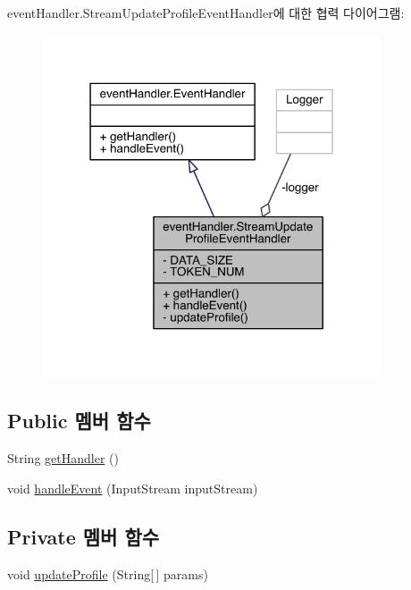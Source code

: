 event\+Handler.\+Stream\+Update\+Profile\+Event\+Handler에 대한 협력 다이어그램\+:
\nopagebreak
\begin{figure}[H]
\begin{center}
\leavevmode
\includegraphics[width=283pt]{classevent_handler_1_1_stream_update_profile_event_handler__coll__graph}
\end{center}
\end{figure}
\subsection*{Public 멤버 함수}
\begin{DoxyCompactItemize}
\item 
String \hyperlink{classevent_handler_1_1_stream_update_profile_event_handler_a24bf455a312c225975d472516b4bb6f9}{get\+Handler} ()
\item 
void \hyperlink{classevent_handler_1_1_stream_update_profile_event_handler_a96b3a510c642a6848cff0afce54b7d8e}{handle\+Event} (Input\+Stream input\+Stream)
\end{DoxyCompactItemize}
\subsection*{Private 멤버 함수}
\begin{DoxyCompactItemize}
\item 
void \hyperlink{classevent_handler_1_1_stream_update_profile_event_handler_a888b80c6db463e195fe9ebefc39c721e}{update\+Profile} (String\mbox{[}$\,$\mbox{]} params)
\end{DoxyCompactItemize}
